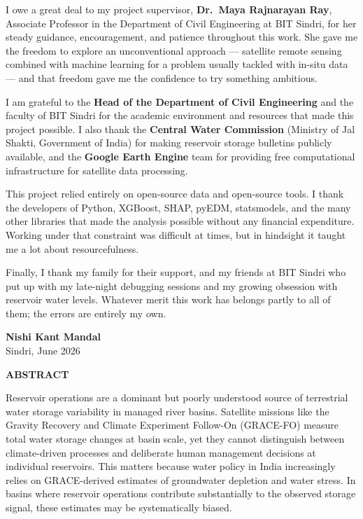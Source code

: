 \documentclass[12pt,a4paper,oneside]{report}
\begin{document}
\vspace{1cm}

\noindent
I owe a great deal to my project supervisor, \textbf{Dr.\ Maya Rajnarayan
Ray}, Associate Professor in the Department of Civil Engineering at BIT
Sindri, for her steady guidance, encouragement, and patience throughout this
work. She gave me the freedom to explore an unconventional approach
--- satellite remote sensing combined with machine learning for a problem
usually tackled with in-situ data --- and that freedom gave me the
confidence to try something ambitious.

I am grateful to the \textbf{Head of the Department of Civil Engineering}
and the faculty of BIT Sindri for the academic environment and resources
that made this project possible. I also thank the \textbf{Central Water
Commission} (Ministry of Jal Shakti, Government of India) for making
reservoir storage bulletins publicly available, and the \textbf{Google Earth
Engine} team for providing free computational infrastructure for satellite
data processing.

This project relied entirely on open-source data and open-source tools. I
thank the developers of Python, XGBoost, SHAP, pyEDM, statsmodels, and the
many other libraries that made the analysis possible without any financial
expenditure. Working under that constraint was difficult at times, but in
hindsight it taught me a lot about resourcefulness.

Finally, I thank my family for their support, and my friends at BIT Sindri
who put up with my late-night debugging sessions and my growing obsession
with reservoir water levels. Whatever merit this work has belongs partly to
all of them; the errors are entirely my own.

\vspace{1cm}

\hfill\textbf{Nishi Kant Mandal}\\
\hfill Sindri, June 2026

\newpage
\thispagestyle{empty}
\begin{center}
{\Large\bfseries ABSTRACT}
\end{center}

\vspace{0.5cm}

\noindent
Reservoir operations are a dominant but poorly understood source of
terrestrial water storage variability in managed river basins. Satellite
missions like the Gravity Recovery and Climate Experiment Follow-On
(GRACE-FO) measure total water storage changes at basin scale, yet they
cannot distinguish between climate-driven processes and deliberate human
management decisions at individual reservoirs. This matters because water
policy in India increasingly relies on GRACE-derived estimates of groundwater
depletion and water stress. In basins where reservoir operations contribute
substantially to the observed storage signal, these estimates may be
systematically biased.
\end{document}
